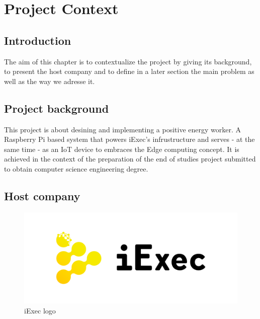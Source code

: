 
\chapter{Project Context}

\section{Introduction}
  The aim of this chapter is to contextualize the project by giving its background,
  to present the host company and to define in a later section the main problem as well
  as the way we adresse it.

\section{Project background}
  This project is about desining and implementing a positive energy worker.
  A Raspberry Pi based system that powers iExec's infrustructure and serves - at the same
  time - as an IoT device to embraces the Edge computing concept.
  It is achieved in the context of the preparation of the end of studies project submitted to
  obtain computer science engineering degree.

\section{Host company}

  \begin{figure}[!h]\centering
    \includegraphics[width=.5\columnwidth]{2-Context/figs/iExec-logo.pdf}
    \caption{iExec logo}
  \end{figure}

